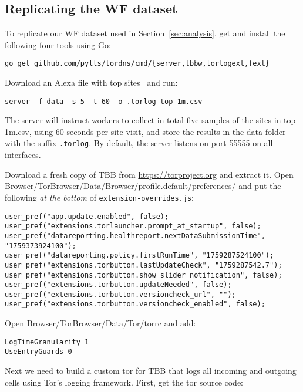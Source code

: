 \subsection{Replicating the WF dataset}
To replicate our WF dataset used in Section~\ref{sec:analysis}, get and
install the following four tools using Go:
\begin{lstlisting}
go get github.com/pylls/tordns/cmd/{server,tbbw,torlogext,fext}
\end{lstlisting}

Download an Alexa file with top sites~\cite{alexatop1k} and run:

\begin{lstlisting}
server -f data -s 5 -t 60 -o .torlog top-1m.csv
\end{lstlisting}
The server will instruct workers to collect in total
five samples of the sites in top-1m.csv, using 60 seconds per site visit,
and store the results in the data folder with the suffix \texttt{.torlog}.
By default, the server listens on port 55555 on all interfaces.

Download a fresh copy of TBB from \url{https://torproject.org} and extract it.
Open Browser/TorBrowser/Data/Browser/profile.default/preferences/
and put the
following \emph{at the bottom} of \texttt{extension-overrides.js}:

\begin{lstlisting}
user_pref("app.update.enabled", false);
user_pref("extensions.torlauncher.prompt_at_startup", false);
user_pref("datareporting.healthreport.nextDataSubmissionTime", "1759373924100");
user_pref("datareporting.policy.firstRunTime", "1759287524100");
user_pref("extensions.torbutton.lastUpdateCheck", "1759287542.7");
user_pref("extensions.torbutton.show_slider_notification", false);
user_pref("extensions.torbutton.updateNeeded", false);
user_pref("extensions.torbutton.versioncheck_url", "");
user_pref("extensions.torbutton.versioncheck_enabled", false);
\end{lstlisting}

Open Browser/TorBrowser/Data/Tor/torrc and add:

\begin{lstlisting}
LogTimeGranularity 1
UseEntryGuards 0
\end{lstlisting}

Next we need to build a custom tor for TBB that logs all incoming and outgoing
cells using Tor's logging framework. First, get the tor source code:


